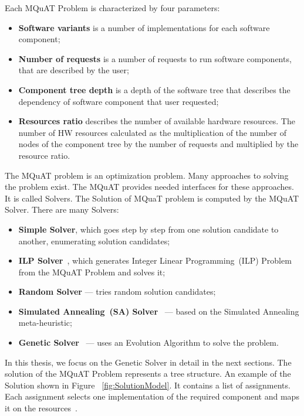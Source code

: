 Each MQuAT Problem is characterized by four parameters:

\begin{itemize}
	\item \textbf{Software variants} is a number of implementations for each software component;
	\item \textbf{Number of requests} is a number of requests to run software components, that are described by the user;
	\item \textbf{Component tree depth} is a depth of the software tree that describes the dependency of software component that user requested;
	\item \textbf{Resources ratio} describes the number of available hardware resources. The number of HW resources calculated as the multiplication of the number of nodes of the component tree by the number of requests and multiplied by the resource ratio.
\end{itemize}

The MQuAT problem is an optimization problem. Many approaches to solving the problem exist. The MQuAT provides needed interfaces for these approaches. It is called Solvers.
The Solution of MQuaT problem is computed by the MQuAT Solver. There are many Solvers:

\begin{itemize}
	\item \textbf{Simple Solver}, which goes step by step from one solution candidate to another, enumerating solution candidates;
	\item \textbf{ILP Solver}~\cite{gotz18}, which generates Integer Linear Programming~(ILP) Problem from the MQuAT Problem and solves it;
	\item \textbf{Random Solver} — tries random solution candidates;
	\item \textbf{Simulated Annealing~(SA) Solver}~\cite{pukhkaiev19} — based on the Simulated Annealing meta-heuristic;
	\item \textbf{Genetic Solver}~\cite{ahmad18} — uses an Evolution Algorithm to solve the problem.
\end{itemize}

In this thesis, we focus on the Genetic Solver in detail in the next sections. The solution of the MQuAT Problem represents a tree structure. An example of the Solution shown in Figure ~\ref{fig:SolutionModel}. It contains a list of assignments. Each assignment selects one implementation of the required component and maps it on the resources~\cite{gotz18}.


